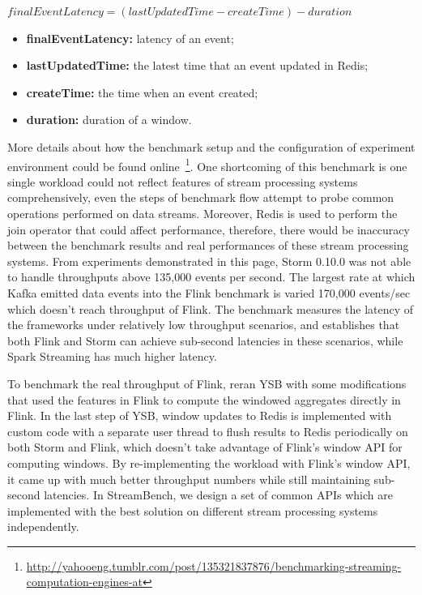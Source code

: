 $finalEventLatency = (lastUpdatedTime - createTime) - duration$

\begin{itemize}
  \item \textbf{finalEventLatency:} latency of an event; 
  \item \textbf{lastUpdatedTime:} the latest time that an event updated in Redis;
  \item \textbf{createTime:} the time when an event created; 
  \item \textbf{duration:} duration of a window.
\end{itemize}

More details about how the benchmark setup and the configuration of experiment environment could be found online~\footnote{\url{http://yahooeng.tumblr.com/post/135321837876/benchmarking-streaming-computation-engines-at}}. One shortcoming of this benchmark is one single workload could not reflect features of stream processing systems comprehensively, even the steps of benchmark flow attempt to probe common operations performed on data streams. Moreover, Redis is used to perform the join operator that could affect performance, therefore, there would be inaccuracy between the benchmark results and real performances of these stream processing systems. From experiments demonstrated in this page, Storm 0.10.0 was not able to handle throughputs above 135,000 events per second. The largest rate at which Kafka emitted data events into the Flink benchmark is varied 170,000 events/sec which doesn't reach throughput of Flink. The benchmark measures the latency of the frameworks under relatively low throughput scenarios, and establishes that both Flink and Storm can achieve sub-second latencies in these scenarios, while Spark Streaming has much higher latency.

To benchmark the real throughput of Flink, \citet{extend-YSB} reran YSB with some modifications that used the features in Flink to compute the windowed aggregates directly in Flink. In the last step of YSB, window updates to Redis is implemented with custom code with a separate user thread to flush results to Redis periodically on both Storm and Flink, which doesn't take advantage of Flink's window API for computing windows. By re-implementing the workload with Flink's window API, it came up with much better throughput numbers while still maintaining sub-second latencies. In StreamBench, we design a set of common APIs which are implemented with the best solution on different stream processing systems independently.
\clearpage




